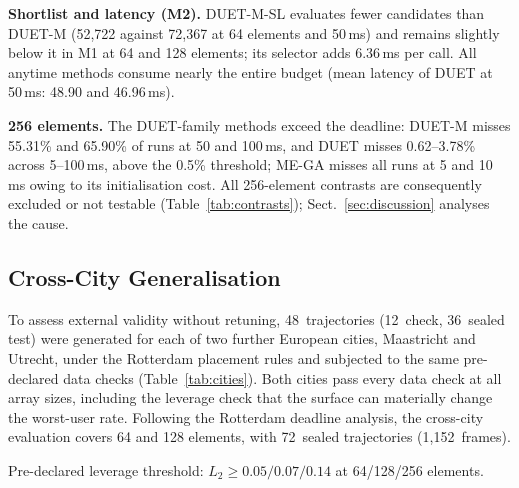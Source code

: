 \documentclass[runningheads]{llncs}
\newcommand{\duet}{\mbox{DUET}}\newcommand{\duetD}{\mbox{DUET-D}}\newcommand{\duetE}{\mbox{DUET-E}}
\newcommand{\bts}{\mbox{DUET-M}}
\begin{document}
\textbf{Shortlist and latency (M2).} \bts{}-SL evaluates fewer candidates than \bts{} (52,722 against 72,367 at 64 elements and 50\,ms) and remains slightly below it in M1 at 64 and 128 elements; its selector adds 6.36\,ms per call. All anytime methods consume nearly the entire budget (mean latency of \duet{} at 50\,ms: 48.90 and 46.96\,ms).

\textbf{256 elements.} The \duet{}-family methods exceed the deadline: \bts{} misses 55.31\% and 65.90\% of runs at 50 and 100\,ms, and \duet{} misses 0.62--3.78\% across 5--100\,ms, above the 0.5\% threshold; ME-GA misses all runs at 5 and 10\,ms owing to its initialisation cost. All 256-element contrasts are consequently excluded or not testable (Table~\ref{tab:contrasts}); Sect.~\ref{sec:discussion} analyses the cause.

\subsection{Cross-City Generalisation}\label{sec:crosscity}
To assess external validity without retuning, 48~trajectories (12~check, 36~sealed test) were generated for each of two further European cities, Maastricht and Utrecht, under the Rotterdam placement rules and subjected to the same pre-declared data checks (Table~\ref{tab:cities}). Both cities pass every data check at all array sizes, including the leverage check that the surface can materially change the worst-user rate. Following the Rotterdam deadline analysis, the cross-city evaluation covers 64 and 128 elements, with 72~sealed trajectories (1,152~frames).

\begin{table}[t]
\centering
\caption{GeoRIS-Bench cities used in this paper and their data checks. $L_2$: median worst-user gain (bit/s/Hz) of a long offline search over the all-OFF state on the check split.}\label{tab:cities}
\raggedright{\scriptsize Pre-declared leverage threshold: $L_2\ge0.05/0.07/0.14$ at 64/128/256 elements.}
\vspace{-6pt}
\end{table}
\end{document}
